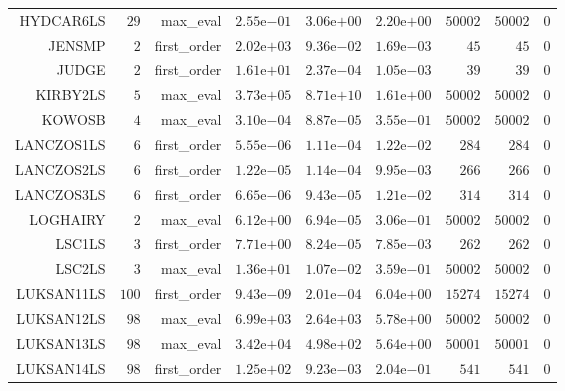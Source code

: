 \begin{longtable}{rrrrrrrrr}
HYDCAR6LS & \(    29\) & max\_eval & \( 2.55\)e\(-01\) & \( 3.06\)e\(+00\) & \( 2.20\)e\(+00\) & \( 50002\) & \( 50002\) & \(     0\) \\
JENSMP & \(     2\) & first\_order & \( 2.02\)e\(+03\) & \( 9.36\)e\(-02\) & \( 1.69\)e\(-03\) & \(    45\) & \(    45\) & \(     0\) \\
JUDGE & \(     2\) & first\_order & \( 1.61\)e\(+01\) & \( 2.37\)e\(-04\) & \( 1.05\)e\(-03\) & \(    39\) & \(    39\) & \(     0\) \\
KIRBY2LS & \(     5\) & max\_eval & \( 3.73\)e\(+05\) & \( 8.71\)e\(+10\) & \( 1.61\)e\(+00\) & \( 50002\) & \( 50002\) & \(     0\) \\
KOWOSB & \(     4\) & max\_eval & \( 3.10\)e\(-04\) & \( 8.87\)e\(-05\) & \( 3.55\)e\(-01\) & \( 50002\) & \( 50002\) & \(     0\) \\
LANCZOS1LS & \(     6\) & first\_order & \( 5.55\)e\(-06\) & \( 1.11\)e\(-04\) & \( 1.22\)e\(-02\) & \(   284\) & \(   284\) & \(     0\) \\
LANCZOS2LS & \(     6\) & first\_order & \( 1.22\)e\(-05\) & \( 1.14\)e\(-04\) & \( 9.95\)e\(-03\) & \(   266\) & \(   266\) & \(     0\) \\
LANCZOS3LS & \(     6\) & first\_order & \( 6.65\)e\(-06\) & \( 9.43\)e\(-05\) & \( 1.21\)e\(-02\) & \(   314\) & \(   314\) & \(     0\) \\
LOGHAIRY & \(     2\) & max\_eval & \( 6.12\)e\(+00\) & \( 6.94\)e\(-05\) & \( 3.06\)e\(-01\) & \( 50002\) & \( 50002\) & \(     0\) \\
LSC1LS & \(     3\) & first\_order & \( 7.71\)e\(+00\) & \( 8.24\)e\(-05\) & \( 7.85\)e\(-03\) & \(   262\) & \(   262\) & \(     0\) \\
LSC2LS & \(     3\) & max\_eval & \( 1.36\)e\(+01\) & \( 1.07\)e\(-02\) & \( 3.59\)e\(-01\) & \( 50002\) & \( 50002\) & \(     0\) \\
LUKSAN11LS & \(   100\) & first\_order & \( 9.43\)e\(-09\) & \( 2.01\)e\(-04\) & \( 6.04\)e\(+00\) & \( 15274\) & \( 15274\) & \(     0\) \\
LUKSAN12LS & \(    98\) & max\_eval & \( 6.99\)e\(+03\) & \( 2.64\)e\(+03\) & \( 5.78\)e\(+00\) & \( 50002\) & \( 50002\) & \(     0\) \\
LUKSAN13LS & \(    98\) & max\_eval & \( 3.42\)e\(+04\) & \( 4.98\)e\(+02\) & \( 5.64\)e\(+00\) & \( 50001\) & \( 50001\) & \(     0\) \\
LUKSAN14LS & \(    98\) & first\_order & \( 1.25\)e\(+02\) & \( 9.23\)e\(-03\) & \( 2.04\)e\(-01\) & \(   541\) & \(   541\) & \(     0\) \\

\end{longtable}
